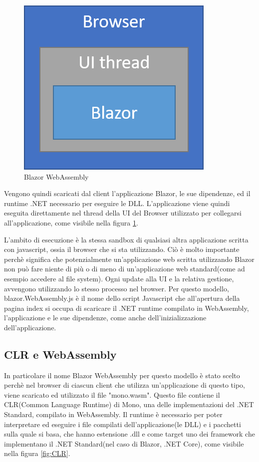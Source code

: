 \begin{figure}[H]
	\centerline{\includegraphics[scale=0.6]{figure/blazor-WebAssembly.png}}
	\caption{Blazor WebAssembly}
	\label{fig:BlazorWebAssembly}
\end{figure}

Vengono quindi scaricati dal client l'applicazione Blazor, le sue dipendenze, ed il runtime .NET necessario per eseguire le DLL.
L'applicazione viene quindi eseguita direttamente nel thread della UI del Browser utilizzato per collegarsi all'applicazione, come visibile nella figura \ref{fig:BlazorWebAssembly}.

L'ambito di esecuzione \`e la stessa sandbox di qualsiasi altra applicazione scritta con javascript, ossia il browser che si sta utilizzando.
Ci\`o \`e molto importante perch\`e significa che potenzialmente un'applicazione web scritta utilizzando Blazor non pu\`o fare niente di pi\`u o di meno di un'applicazione web standard(come ad esempio accedere al file system).
Ogni update alla UI e la relativa gestione, avvengono utilizzando lo stesso processo nel browser.
Per questo modello, blazor.WebAssembly.js \`e il nome dello script Javascript che all'apertura della pagina index si occupa di scaricare il .NET runtime compilato in WebAssembly, l'applicazione e le sue dipendenze, come anche dell'inizializzazione dell'applicazione.

\subsection{CLR e WebAssembly}\label{sez:webAssembly}
In particolare il nome Blazor WebAssembly per questo modello \`e stato scelto perch\`e nel browser di ciascun client che utilizza un'applicazione di questo tipo, viene scaricato ed utilizzato il file "mono.wasm".
Questo file contiene il CLR(Common Language Runtime) di Mono, una delle implementazioni del .NET Standard, compilato in WebAssembly.
Il runtime \`e necessario per poter interpretare ed eseguire i file compilati dell'applicazione(le DLL) e i pacchetti sulla quale si basa, che hanno estensione .dll e come target uno dei framework che implementano il .NET Standard(nel caso di Blazor, .NET Core), come visibile nella figura \ref{fig:CLR}.

